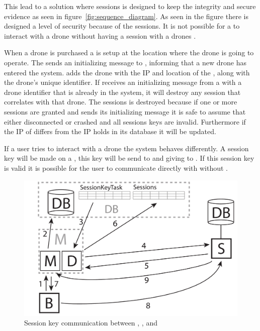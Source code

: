 This lead to a solution where sessions is designed to keep the integrity and secure evidence as seen in figure~\ref{fig:sequence_diagram}. 
As seen in the figure there is designed a level of security because of the sessions.
It is not possible for a  to interact with a drone without having a session with a drones .

When a drone is purchased a  is setup at the location where the drone is going to operate.
The  sends an initializing message to , informing  that a new drone has entered the system.
 adds the drone with the IP and location of the , along with the drone's unique identifier.
If  receives an initializing message from a  with a drone identifier that is already in the system, it will destroy any session that correlates with that drone.
The sessions is destroyed because if one or more sessions are granted and  sends its initializing message it is safe to assume that  either disconnected or crashed and all sessions keys are invalid.
Furthermore if the IP of  differs from the IP  holds in its database it will be updated.

If a user tries to interact with a drone the system behaves differently.
A session key will be made on a , this key will be send to  and giving to . If this session key is valid it is possible for the user to communicate directly with  without .

\begin{figure}[!h]
    \centering 
    \includegraphics[width=\textwidth]{gfx/sessionkey_communication.pdf}
    \caption{Session key communication between , , and }
    \label{fig:sessionkey_communication}
\end{figure}

